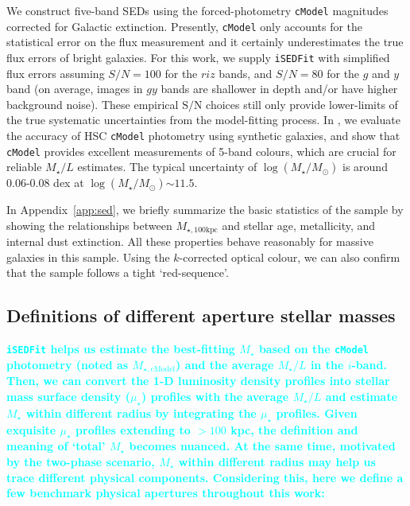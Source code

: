 \documentclass[fleqn,usenatbib]{mnras}
\def\cmodel{\texttt{cModel}}
\def\mstar{{$M_{\star}$}}
\def\logms{{$\log (M_{\star}/M_{\odot})$}}
\def\mtot{{$M_{\star,100\mathrm{kpc}}$}}
\def\mcmodel{{$M_{\star,\mathrm{cModel}}$}}
\def\m2l{{$M_{\star}/L$}}
\def\s2n{{$\mathrm{S}/\mathrm{N}$}}
\def\mden{{$\mu_{\star}$}}
\newcommand{\song}[1]{\textcolor{cyan}{\textbf{#1}}}
\begin{document}
    We construct five-band SEDs using the forced-photometry \cmodel{} magnitudes 
    corrected for Galactic extinction. 
    Presently, \cmodel{} only accounts for the statistical error on the flux 
    measurement and it certainly underestimates the true flux errors of bright 
    galaxies.  
    For this work, we supply \texttt{iSEDFit} with simplified flux errors assuming 
    $S/N = 100$ for the $riz$ bands, and $S/N = 80$ for the $g$ and $y$ band 
    (on average, images in $gy$ bands are shallower in depth and/or have higher 
    background noise).  
    These empirical \s2n{} choices still only provide lower-limits of the true 
    systematic uncertainties from the model-fitting process. 
    In \citealt{SynPipe}, we evaluate the accuracy of HSC \cmodel{} photometry 
    using synthetic galaxies, and show that \cmodel{} provides excellent measurements 
    of 5-band colours, which are crucial for reliable \m2l{} estimates.
    The typical uncertainty of \logms{} is around 0.06-0.08 dex at \logms${\sim} 11.5$.
    
    In Appendix~\ref{app:sed}, we briefly summarize the basic statistics of 
    the sample by showing the relationships between \mtot{} and stellar age, 
    metallicity, and internal dust extinction. 
    All these properties behave reasonably for massive galaxies in this sample. 
    Using the $k$-corrected optical colour, we can also confirm that the sample 
    follows a tight `red-sequence'.  
      


\subsection{Definitions of different aperture stellar masses}
    \label{ssec:mtotal}
    
    \song{
    \texttt{iSEDFit} helps us estimate the best-fitting \mstar{} based on the \cmodel{} 
    photometry (noted as \mcmodel{}) and the average \m2l{} in the $i$-band. 
    Then, we can convert the 1-D luminosity density profiles into stellar mass 
    surface density (\mden{}) profiles with the average \m2l{} and estimate \mstar{} 
    within different radius by integrating the \mden{} profiles. 
    Given exquisite \mden{} profiles extending to $>100$ kpc, the definition and meaning 
    of `total' \mstar{} becomes nuanced.
    At the same time, motivated by the two-phase scenario, \mstar{} within different 
    radius may help us trace different physical components. 
    Considering this, here we define a few benchmark physical apertures throughout 
    this work:   
    }
\end{document}

